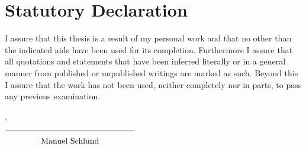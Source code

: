 


\chapter{Statutory Declaration}

I assure that this thesis is a result of my personal work and that no other than the indicated aids have been used for its completion. Furthermore I assure that all quotations and statements that have been inferred literally or in a general manner from published or unpublished writings are marked as such. Beyond this I assure that the work has not been used, neither completely nor in parts, to pass any previous examination.

\vspace{20mm}

\noindent \thePlace{}, \theDate{}

\begin{flushright}
  $\overline{~~~~~~~~~~~~~\raisebox{0mm}[5mm]{\theAuthor{}}~~~~~~~~~~~~~}$
\end{flushright}